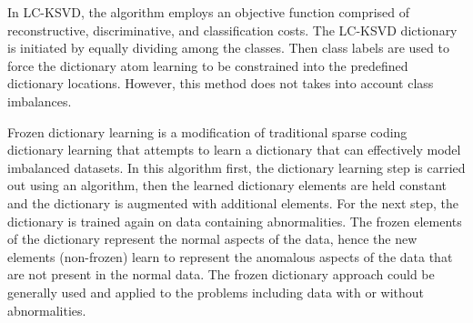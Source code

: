 
In LC-KSVD\cite{Jiang2011}, the algorithm employs an objective function comprised of reconstructive, discriminative, and classification costs. The LC-KSVD dictionary is initiated by equally dividing among the classes. Then class labels are used to force the dictionary atom learning to be constrained into the predefined dictionary locations. However, this method does not takes into account class imbalances.

Frozen dictionary learning is a modification of traditional sparse coding dictionary learning that attempts to learn a dictionary that can effectively model imbalanced datasets\cite{Carroll2017}. In this algorithm first, the dictionary learning step is carried out using an algorithm, then the learned dictionary elements are held constant and the dictionary is augmented with additional elements. For the next step, the dictionary is trained again on data containing abnormalities. The frozen elements of the dictionary represent the normal aspects of the data, hence the new elements (non-frozen) learn to represent the anomalous aspects of the data that are not present in the normal data. The frozen dictionary approach could be generally used and applied to the problems including data with or without abnormalities. 

    


